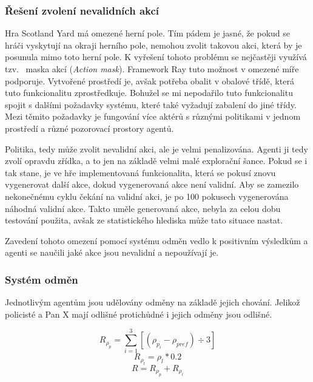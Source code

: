 \subsubsection*{Řešení zvolení nevalidních akcí}

Hra Scotland Yard má omezené herní pole.
Tím pádem je jasné, že pokud se hráči vyskytují na okraji herního pole, nemohou zvolit takovou akci, která by je posunula mimo toto herní pole.
K vyřešení tohoto problému se nejčastěji využívá tzv.~ maska akcí (\emph{Action mask}).
Framework Ray tuto možnost v omezené míře podporuje.
Vytvořené prostředí je, avšak potřeba obalit v obalové třídě, která tuto funkcionalitu zprostředkuje.
Bohužel se mi nepodařilo tuto funkcionalitu spojit s dalšími požadavky systému, které také vyžadují zabalení do jiné třídy.
Mezi těmito požadavky je fungování více aktérů s různými politikami v jednom prostředí a různé pozorovací prostory agentů.

Politika, tedy může zvolit nevalidní akci, ale je velmi penalizována.
Agenti ji tedy zvolí opravdu zřídka, a to jen na základě velmi malé explorační šance.
Pokud se i tak stane, je ve hře implementovaná funkcionalita, která se pokusí znovu vygenerovat další akce, dokud vygenerovaná akce není validní.
Aby se zamezilo nekonečnému cyklu čekání na validní akci, je po 100 pokusech vygenerována náhodná validní akce.
Takto uměle generovaná akce, nebyla za celou dobu testování použita, avšak ze statistického hlediska může tato situace nastat.

Zavedení tohoto omezení pomocí systému odměn vedlo k positivním výsledkům a agenti se naučili jaké akce jsou nevalidní a nepoužívají je.

\subsubsection*{Systém odměn}
\label{subsec:odmena}

Jednotlivým agentům jsou udělovány odměny na základě jejich chování.
Jelikož policisté a Pan X mají odlišné protichůdné i jejich odměny jsou odlišné.

\begin{equation}
    \label{eq:odmena_za_vzdalenost_od_policisty}
  R_{\rho_p} = \sum_{i=1}^{3}[(\rho_{p_i} - \rho_{pref}) \div 3]
\end{equation}
\begin{equation}
    \label{eq:odmena_za_vzdalenost_od_posledni_pozice}
  R_{\rho_l} = \rho_l * 0.2
\end{equation}
\begin{equation}
    \label{eq:celkova_odmena}
  R = R_{\rho_p} + R_{\rho_l}
\end{equation}

